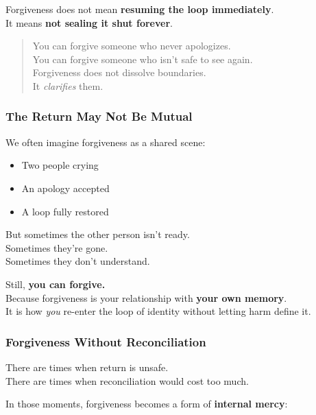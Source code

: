 Forgiveness does not mean \textbf{resuming the loop immediately}.\\
It means \textbf{not sealing it shut forever}.

\begin{quote}
You can forgive someone who never apologizes.\\
You can forgive someone who isn't safe to see again.\\
Forgiveness does not dissolve boundaries.\\
It \emph{clarifies} them.
\end{quote}

\subsubsection{\texorpdfstring{\textbf{The Return May Not Be
Mutual}}{The Return May Not Be Mutual}}\label{the-return-may-not-be-mutual}

We often imagine forgiveness as a shared scene:

\begin{itemize}
\item
  Two people crying
\item
  An apology accepted
\item
  A loop fully restored
\end{itemize}

But sometimes the other person isn't ready.\\
Sometimes they're gone.\\
Sometimes they don't understand.

Still, \textbf{you can forgive.\\
} Because forgiveness is your relationship with \textbf{your own
memory}.\\
It is how \emph{you} re-enter the loop of identity without letting harm
define it.

\subsubsection{\texorpdfstring{\textbf{Forgiveness Without
Reconciliation}}{Forgiveness Without Reconciliation}}\label{forgiveness-without-reconciliation}

There are times when return is unsafe.\\
There are times when reconciliation would cost too much.

In those moments, forgiveness becomes a form of \textbf{internal mercy}:

